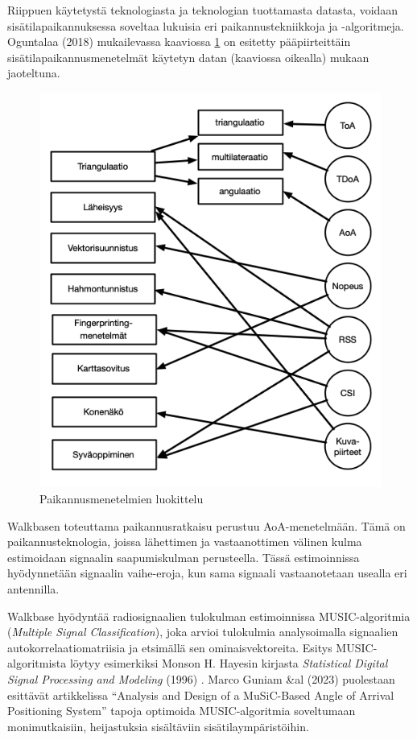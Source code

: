 \documentclass[
  12pt,
  a4paper, twoside]{book}
\begin{document}
Riippuen käytetystä teknologiasta ja teknologian tuottamasta datasta, voidaan sisätilapaikannuksessa soveltaa lukuisia eri paikannustekniikkoja ja -algoritmeja. Oguntalaa (2018) \citep{oguntala-2018} mukailevassa kaaviossa \ref{fig:paikannusmenetelmat} on esitetty pääpiirteittäin sisätilapaikannusmenetelmät käytetyn datan (kaaviossa oikealla) mukaan jaoteltuna.

\begin{figure}[H]
\centering
\includegraphics[width=12.5cm]{paikannusmenetelmat}
\caption{Paikannusmenetelmien luokittelu}
\label{fig:paikannusmenetelmat}
\end{figure}

Walkbasen toteuttama paikannusratkaisu perustuu AoA-menetelmään. Tämä on paikannusteknologia, joissa lähettimen ja vastaanottimen välinen kulma estimoidaan signaalin saapumiskulman perusteella. Tässä estimoinnissa hyödynnetään signaalin vaihe-eroja, kun sama signaali vastaanotetaan usealla eri antennilla.

Walkbase hyödyntää radiosignaalien tulokulman estimoinnissa MUSIC-algoritmia (\emph{Multiple Signal Classification}), joka arvioi tulokulmia analysoimalla signaalien autokorrelaatiomatriisia ja etsimällä sen ominaisvektoreita. Esitys MUSIC-algoritmista löytyy esimerkiksi Monson H. Hayesin kirjasta \emph{Statistical Digital Signal Processing and Modeling} (1996) \citep{Hayes-1996}. Marco Guniam \&al (2023) \citep{Gunia-2023} puolestaan esittävät artikkelissa ``Analysis and Design of a MuSiC-Based Angle of Arrival Positioning System'' tapoja optimoida MUSIC-algoritmia soveltumaan monimutkaisiin, heijastuksia sisältäviin sisätilaympäristöihin.
\end{document}
